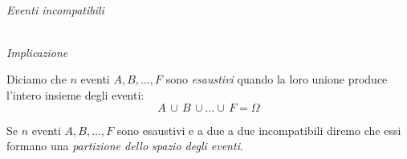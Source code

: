 \begin{minipage}{.48\textwidth}
\begin{inaccessibleblock}
\begin{center} 
\eventiincompatibili \\
\emph{Eventi incompatibili}
\end{center}
\end{inaccessibleblock}
\end{minipage}
\hfill
\begin{minipage}{.48\textwidth}
\begin{inaccessibleblock}[A sottoinsieme di B]
\begin{center} 
\implicazioneeventi \\
\emph{Implicazione}
\end{center}
\end{inaccessibleblock}
\end{minipage}

\begin{definizione}
Diciamo che \( n \) eventi \(A,B,\ldots,F\) sono \emph{esaustivi} quando la 
loro unione produce l'intero insieme degli eventi: 
\[A\,\cup\,B\,\cup\dots \cup \,F=\Omega \]
\end{definizione}

\begin{definizione}
Se \( n \) eventi \(A,B,\ldots,F\) sono esaustivi  e a due a due 
incompatibili  diremo che essi formano una \emph{partizione dello spazio 
degli eventi}.
\end{definizione}


